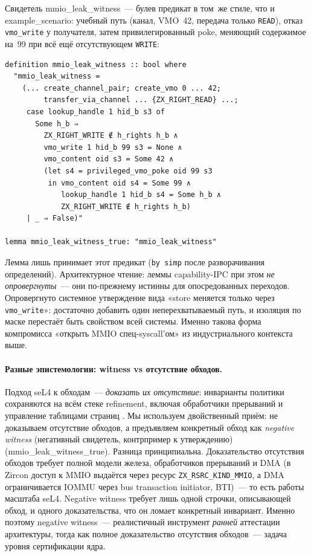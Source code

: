 \documentclass[11pt,a4paper]{article}
\newcommand{\isabel}[1]{{\isabelleit #1}}
\newcommand{\lemmaname}[1]{\isabel{#1}}
\begin{document}
Свидетель \lemmaname{mmio\_leak\_witness}~--- булев предикат в том~же
стиле, что и \lemmaname{example\_scenario}: учебный путь (канал, VMO~42,
передача только \texttt{READ}), отказ \texttt{vmo\_write} у получателя,
затем привилегированный poke, меняющий содержимое на~99 при всё ещё
отсутствующем \texttt{WRITE}:
\begin{lstlisting}
definition mmio_leak_witness :: bool where
  "mmio_leak_witness =
    (... create_channel_pair; create_vmo 0 ... 42;
         transfer_via_channel ... {ZX_RIGHT_READ} ...;
     case lookup_handle 1 hid_b s3 of
       Some h_b ⇒
         ZX_RIGHT_WRITE ∉ h_rights h_b ∧
         vmo_write 1 hid_b 99 s3 = None ∧
         vmo_content oid s3 = Some 42 ∧
         (let s4 = privileged_vmo_poke oid 99 s3
          in vmo_content oid s4 = Some 99 ∧
             lookup_handle 1 hid_b s4 = Some h_b ∧
             ZX_RIGHT_WRITE ∉ h_rights h_b)
     | _ ⇒ False)"

lemma mmio_leak_witness_true: "mmio_leak_witness"
\end{lstlisting}
Лемма лишь принимает этот предикат (\texttt{by~simp} после разворачивания
определений). Архитектурное чтение: леммы \textenglish{capability}-IPC при
этом \emph{не опровергнуты}~--- они по-прежнему истинны для опосредованных
переходов. Опровергнуто системное утверждение вида «store меняется только
через \texttt{vmo\_write}»: достаточно добавить один неперехватываемый
путь, и изоляция по маске перестаёт быть свойством всей системы. Именно
такова форма компромисса «открыть MMIO спец-syscall'ом» из
индустриального контекста выше.

\paragraph{Разные эпистемологии: witness vs отсутствие обходов.}
Подход seL4 к обходам~--- \emph{доказать их отсутствие}: инварианты
политики сохраняются на всём стеке refinement, включая обработчики
прерываний и управление таблицами страниц
\cite{sel4overview}. Мы используем двойственный приём: не доказываем
отсутствие обходов, а предъявляем конкретный обход как \emph{negative witness}
(негативный свидетель, контрпример к утверждению)
(\lemmaname{mmio\_leak\_witness\_true}).
Разница принципиальна. Доказательство отсутствия обходов требует
полной модели железа, обработчиков прерываний и DMA (в Zircon доступ к
MMIO выдаётся через ресурс \texttt{ZX\_RSRC\_KIND\_MMIO}, а DMA
ограничивается IOMMU через bus transaction initiator, BTI)~--- то есть
работы масштаба seL4. Negative witness требует лишь одной строчки, описывающей
обход, и одного доказательства, что он ломает конкретный инвариант.
Именно поэтому negative witness~--- реалистичный инструмент
\emph{ранней} аттестации архитектуры, тогда как полное доказательство
отсутствия обходов~--- задача уровня сертификации ядра.
\end{document}
